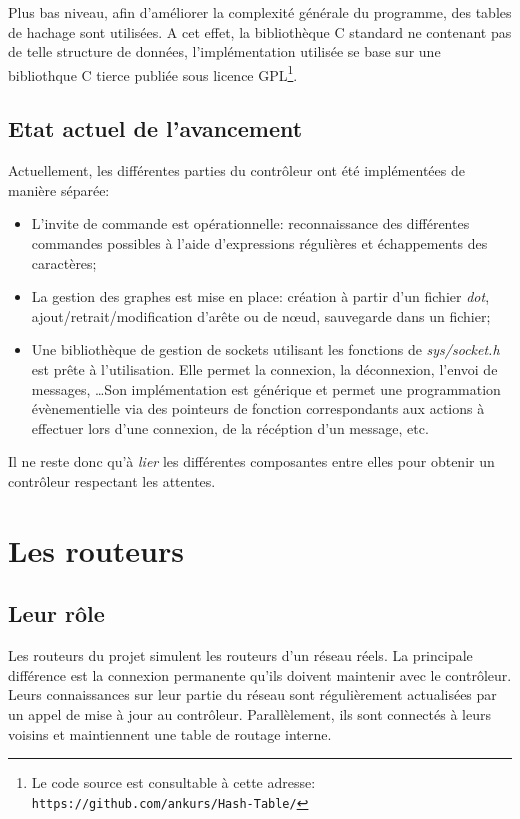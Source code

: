 \documentclass[a4paper,11pt]{article}
\begin{document}
Plus bas niveau, afin d'améliorer la complexité générale du programme, des tables de hachage sont utilisées. A cet effet, la bibliothèque C standard ne contenant pas de telle structure de données, l'implémentation utilisée se base sur une bibliothque C tierce publiée sous licence GPL\footnote{Le code source est consultable à cette adresse: \texttt{https://github.com/ankurs/Hash-Table/}}.

\subsection{Etat actuel de l'avancement}
\label{implementation_controleur}

Actuellement, les différentes parties du contrôleur ont été implémentées de manière séparée:
\begin{itemize}
 \item L'invite de commande est opérationnelle: reconnaissance des différentes commandes possibles à l'aide d'expressions régulières et échappements des caractères;
 \item La gestion des graphes est mise en place: création à partir d'un fichier \textit{dot}, ajout/retrait/modification d'arête ou de n\oe ud, sauvegarde dans un fichier;
 \item Une bibliothèque de gestion de sockets utilisant les fonctions de \textit{sys/socket.h} est prête à l'utilisation. Elle permet la connexion, la déconnexion, l'envoi de messages, \dots Son implémentation est générique et permet une programmation évènementielle via des pointeurs de fonction correspondants aux actions à effectuer lors d'une connexion, de la récéption d'un message, etc.
\end{itemize}
Il ne reste donc qu'à \textit{lier} les différentes composantes entre elles pour obtenir un contrôleur respectant les attentes.


\section{Les routeurs}

\subsection{Leur rôle}

Les routeurs du projet simulent les routeurs d'un réseau réels. La principale différence est la connexion permanente qu'ils doivent maintenir avec le contrôleur. Leurs connaissances sur leur partie du réseau sont régulièrement actualisées par un appel de mise à jour au contrôleur. Parallèlement, ils sont connectés à leurs voisins et maintiennent une table de routage interne.
\end{document}
